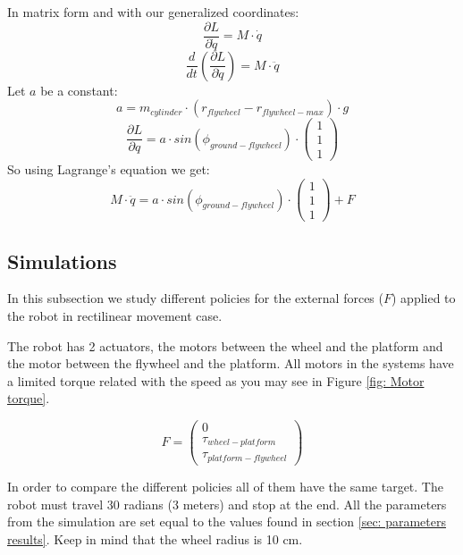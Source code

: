 In matrix form and with our generalized coordinates:
\begin{equation}
	\frac{\partial L}{\partial \dot{q}} =
	M \cdot \dot{q}
\end{equation}
\begin{equation}
	\frac{d}{dt}(\frac{\partial L}{\partial \dot{q}}) = 	M \cdot \ddot{q}
\end{equation}
Let $a$ be a constant:
\begin{equation}
	a = m_{cylinder}\cdot (r_{flywheel}-r_{flywheel-max}) \cdot g
\end{equation}
\begin{equation}
	\frac{\partial L}{\partial q} = a \cdot sin(\phi_{ground-flywheel}) \cdot
	\begin{pmatrix}
		1 \\ 1 \\ 1
	\end{pmatrix}
\end{equation}
So using Lagrange's equation we get:
\begin{equation}
	\boxed{
		M \cdot \ddot{q} = a \cdot sin(\phi_{ground-flywheel}) \cdot
		\begin{pmatrix}
			1 \\ 1 \\ 1
		\end{pmatrix} + F
	}
\end{equation}
\subsection{Simulations}
In this subsection we study different policies for the external forces
($F$) applied to the robot in rectilinear movement case.

The robot has 2 actuators, the motors between the wheel and the platform
and the motor between the flywheel and the platform.
All motors in the systems  have a limited torque related with the
speed as you may see in Figure \ref{fig: Motor torque}.

\begin{equation}
	\boxed{
		F =
		\begin{pmatrix}
			0 \\ \tau_{wheel-platform} \\ \tau_{platform-flywheel}
		\end{pmatrix}
	}
\end{equation}

In order to compare the different policies all of them have the same target.
The robot must travel 30 radians (3 meters) and stop at the end. All the parameters from 
the simulation are set equal to the values found in section \ref{sec: parameters results}.
Keep in mind that the wheel radius is 10 cm.

